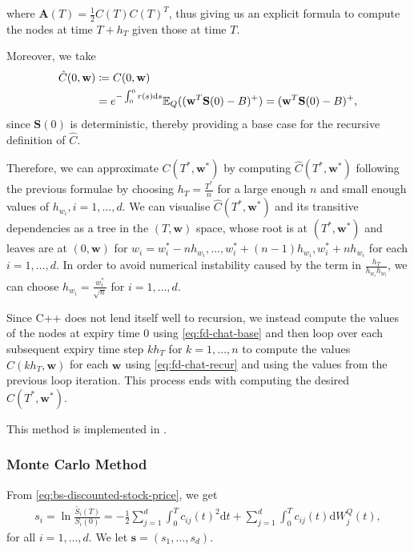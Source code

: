 \documentclass[english]{article}
\numberwithin{equation}{section}
\numberwithin{figure}{section}
\theoremstyle{bolddescit}
\theoremstyle{definition}
\theoremstyle{definition}
\theoremstyle{plain}
\theoremstyle{plain}
\theoremstyle{bolddesc}
\theoremstyle{plain}
\theoremstyle{remark}
\begin{document}
where $\mathbf{A}(T) = \frac{1}{2} C(T) C(T)^T$, thus giving us an explicit formula to compute the nodes at time $T+h_T$ given those at time $T$.

Moreover, we take
\begin{align}
  \hat{C}(0, \mathbf{w})
  &\coloneq C(0, \mathbf{w})\notag\\
  &= e^{-\int_0^0 r(s) \mathrm{d}s} \mathbb{E}_Q((\mathbf{w}^T \mathbf{S}(0) - B)^+)
  = (\mathbf{w}^T \mathbf{S}(0) - B)^+,\label{eq:fd-chat-base}
\end{align}
since $\mathbf{S}(0)$ is deterministic, thereby providing a base case for the recursive definition of $\hat{C}$.

Therefore, we can approximate $C(T^*, \mathbf{w}^*)$ by computing $\hat{C}(T^*, \mathbf{w}^*)$ following the previous formulae by choosing $h_T = \frac{T^*}{n}$ for a large enough $n$ and small enough values of $h_{w_i}, i=1,\ldots,d$. We can visualise $\hat{C}(T^*, \mathbf{w}^*)$ and its transitive dependencies as a tree in the $(T,\mathbf{w})$ space, whose root is at $(T^*, \mathbf{w}^*)$ and leaves are at $(0,\mathbf{w})$ for $w_i = w_i^* - n h_{w_i}, \ldots, w_i^* + (n-1) h_{w_i}, w_i^* + n h_{w_i}$ for each $i=1,\ldots,d$. In order to avoid numerical instability caused by the term in $\frac{h_T}{h_{w_i} h_{w_l}}$, we can choose $h_{w_i} = \frac{w_i^*}{\sqrt{n}}$ for $i=1,\ldots,d$.

Since C++ does not lend itself well to recursion, we instead compute the values of the nodes at expiry time 0 using \eqref{eq:fd-chat-base} and then loop over each subsequent expiry time step $k h_T$ for $k=1,\ldots,n$ to compute the values $\hat{C}(k h_T, \mathbf{w})$ for each $\mathbf{w}$ using \eqref{eq:fd-chat-recur} and using the values from the previous loop iteration. This process ends with computing the desired $\hat{C}(T^*, \mathbf{w}^*)$.

This method is implemented in .

\subsubsection{Monte Carlo Method}

From \eqref{eq:bs-discounted-stock-price}, we get
\begin{align*}
  s_i = \ln \frac{\widetilde{S_i}(T)}{S_i(0)} = - \frac{1}{2} \sum_{j=1}^{d} \int_0^T c_{ij}(t)^2 \mathrm{d}t + \sum_{j=1}^{d} \int_0^T c_{ij}(t) \mathrm{d}W^Q_j(t),
\end{align*}
for all $i=1,\ldots,d$. We let $\mathbf{s} = (s_1,\ldots,s_d)$.
\end{document}
